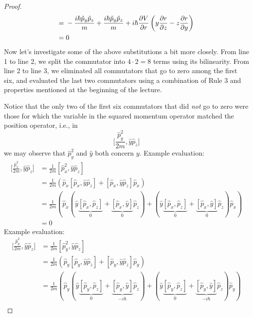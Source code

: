 \documentclass[../psets.tex]{subfiles}
\begin{document}
\begin{enumerate}
\begin{enumerate}
\begin{proof}
\begin{align*}
                ={}& -\frac{i\hbar\hat{p}_y\hat{p}_z}{m}+\frac{i\hbar\hat{p}_y\hat{p}_z}{m}+i\hbar\pdv{V}{r}\left( y\pdv{r}{z}-z\pdv{r}{y} \right)\\
                ={}& 0
            \end{align*}
            Now let's investigate some of the above substitutions a bit more closely. From line 1 to line 2, we split the commutator into $4\cdot 2=8$ terms using its bilinearity. From line 2 to line 3, we eliminated all commutators that go to zero among the first six, and evaluated the last two commutators using a combination of Rule 3 and properties mentioned at the beginning of the lecture.
            \par Notice that the only two of the first six commutators that did \emph{not} go to zero were those for which the variable in the squared momentum operator matched the position operator, i.e., in
            \begin{equation*}
                \Bigg[ \frac{\hat{p}_y^2}{2m},\hat{y}\hat{p}_z \Bigg]
            \end{equation*}
            we may observe that $\hat{p}_y^2$ and $\hat{y}$ both concern $y$.
            Example evaluation:
            \begin{align*}
                \Bigg[ \frac{\hat{p}_x^2}{2m},\hat{y}\hat{p}_z \Bigg] &= \frac{1}{2m}[\hat{p}_x^2,\hat{y}\hat{p}_z]\\
                &= \frac{1}{2m}(\hat{p}_x[\hat{p}_x,\hat{y}\hat{p}_z]+[\hat{p}_x,\hat{y}\hat{p}_z]\hat{p}_x)\\
                &= \frac{1}{2m}(\hat{p}_x(\hat{y}\underbrace{[\hat{p}_x,\hat{p}_z]}_0+\underbrace{[\hat{p}_x,\hat{y}]}_0\hat{p}_z)+(\hat{y}\underbrace{[\hat{p}_x,\hat{p}_z]}_0+\underbrace{[\hat{p}_x,\hat{y}]}_0\hat{p}_z)\hat{p}_x)\\
                &= 0
            \end{align*}
            Example evaluation:
            \begin{align*}
                \Bigg[ \frac{\hat{p}_y^2}{2m},\hat{y}\hat{p}_z \Bigg] &= \frac{1}{2m}[\hat{p}_y^2,\hat{y}\hat{p}_z]\\
                &= \frac{1}{2m}(\hat{p}_y[\hat{p}_y,\hat{y}\hat{p}_z]+[\hat{p}_y,\hat{y}\hat{p}_z]\hat{p}_y)\\
                &= \frac{1}{2m}(\hat{p}_y(\hat{y}\underbrace{[\hat{p}_y,\hat{p}_z]}_0+\underbrace{[\hat{p}_y,\hat{y}]}_{-i\hbar}\hat{p}_z)+(\hat{y}\underbrace{[\hat{p}_y,\hat{p}_z]}_0+\underbrace{[\hat{p}_y,\hat{y}]}_{-i\hbar}\hat{p}_z)\hat{p}_y)\\

\end{align*}
\end{proof}
\end{enumerate}
\end{enumerate}
\end{document}
